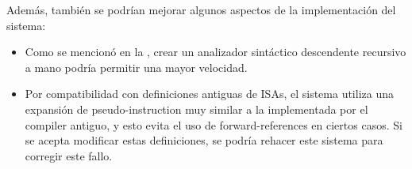 \noindent
Además, también se podrían mejorar algunos aspectos de la implementación del
sistema:

\begin{itemize}
    \item Como se mencionó en la , crear un analizador
    sintáctico descendente recursivo a mano podría permitir una mayor velocidad.
    \item Por compatibilidad con definiciones antiguas de \glspl{ISA}, el
    sistema utiliza una expansión de \gls{pseudo-instruction} muy similar a la
    implementada por el \gls{compiler} antiguo, y esto evita el uso de
    \glspl{forward-reference} en ciertos casos. Si se acepta modificar estas
    definiciones, se podría rehacer este sistema para corregir este fallo.
\end{itemize}
